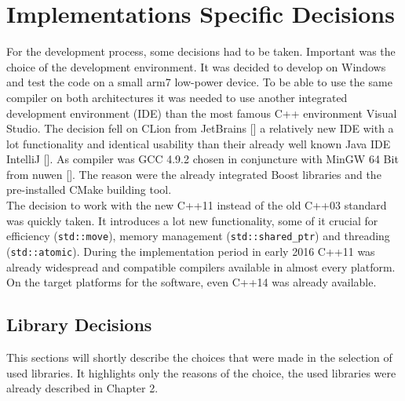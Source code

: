 \section{Implementations Specific Decisions}
For the development process, some decisions had to be taken. Important was the choice of the development environment. It was decided to develop on Windows and test the code on a small arm7 low-power device. To be able to use the same compiler on both architectures it was needed to use another integrated development environment (IDE) than the most famous C++ environment Visual Studio. The decision fell on CLion from JetBrains [] a relatively new IDE with a lot functionality and identical usability than their already well known Java IDE IntelliJ []. As compiler was GCC 4.9.2 chosen in conjuncture with MinGW 64 Bit from nuwen []. The reason were the already integrated Boost libraries and the pre-installed CMake building tool.\\
The decision to work with the new C++11 instead of the old C++03 standard was quickly taken. It introduces a lot new functionality, some of it crucial for efficiency (\texttt{std::move}), memory management (\texttt{std::shared\_ptr}) and threading (\texttt{std::atomic}). During the implementation period in early 2016 C++11 was already widespread and compatible compilers available in almost every platform. On the target platforms for the software, even C++14 was already available.
\subsection{Library Decisions}
This sections will shortly describe the choices that were made in the selection of used libraries. It highlights only the reasons of the choice, the used libraries were already described in Chapter 2.

